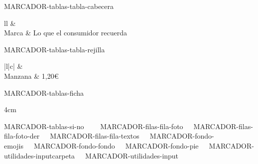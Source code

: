 \documentclass[11pt,a4paper]{extarticle}
\begin{document}
\newpage
{\color{white}\tiny MARCADOR-tablas-tabla-cabecera}
\begin{tablacabecera}{ll}
   &  \\
  \midrule
  Marca & Lo que el consumidor recuerda \\
\end{tablacabecera}

\newpage
{\color{white}\tiny MARCADOR-tablas-tabla-rejilla}
\begin{tablacuadricula}{|l|c|}
   &  \\ \hline
  Manzana & 1,20€ \\ \hline
\end{tablacuadricula}

\newpage
{\color{white}\tiny MARCADOR-tablas-ficha}
\begin{fichaclave}{4cm}
\end{fichaclave}

\newpage
{\color{white}\tiny MARCADOR-tablas-si-no}
\si\ \no

\newpage
{\color{white}\tiny MARCADOR-filas-fila-foto}

\newpage
{\color{white}\tiny MARCADOR-filas-fila-foto-der}

\newpage
{\color{white}\tiny MARCADOR-filas-fila-textos}

\newpage
{\color{white}\tiny MARCADOR-fondo-emojis}

\newpage
{\color{white}\tiny MARCADOR-fondo-fondo}
\usarfondo

\newpage
{\color{white}\tiny MARCADOR-fondo-pie}

\newpage
{\color{white}\tiny MARCADOR-utilidades-inputcarpeta}

\newpage
{\color{white}\tiny MARCADOR-utilidades-input}
\begin{verbatim}

\end{verbatim}
\end{document}
